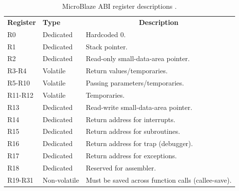 \documentclass{UoYCSproject}
\begin{document}
\begin{table}[H]
\centering
\begin{tabular}{ |p{2cm}|p{3cm}|p{8cm}| }
\textbf{Register} & \textbf{Type} & \multicolumn{1}{c}{\textbf{Description}} \\
R0       & Dedicated    & Hardcoded 0. \\[0.05cm]
R1       & Dedicated    & Stack pointer. \\[0.05cm]
R2       & Dedicated    & Read-only small-data-area pointer. \\[0.05cm]
R3-R4    & Volatile     & Return values/temporaries. \\[0.05cm]
R5-R10   & Volatile     & Passing parameters/temporaries. \\[0.05cm]
R11-R12  & Volatile     & Temporaries. \\[0.05cm]
R13      & Dedicated    & Read-write small-data-area pointer. \\[0.05cm]
R14      & Dedicated    & Return address for interrupts. \\[0.05cm]
R15      & Dedicated    & Return address for subroutines. \\[0.05cm]
R16      & Dedicated    & Return address for trap (debugger). \\[0.05cm]
R17      & Dedicated    & Return address for exceptions. \\[0.05cm]
R18      & Dedicated    & Reserved for assembler. \\[0.05cm]
R19-R31  & Non-volatile & Must be saved across function calls (callee-save).
\end{tabular}
\caption{MicroBlaze ABI register descriptions \cite{microblaze-ref}.}
\label{table:abi}
\end{table}

\printbibliography
\end{document}
